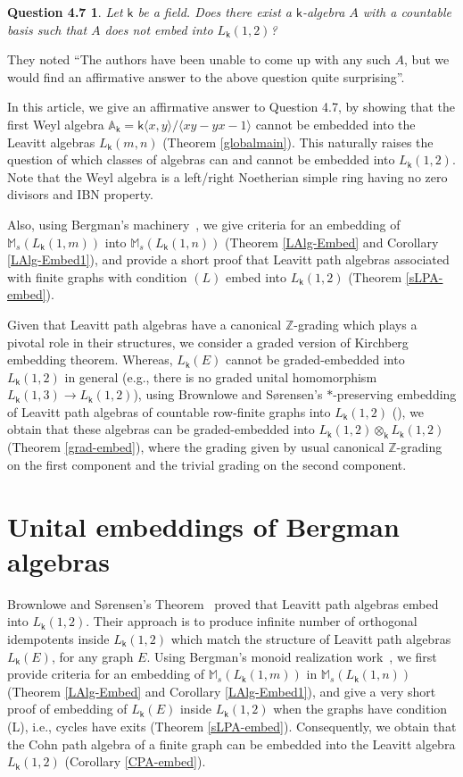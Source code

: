 \documentclass[a4paper, 11pt, reqno]{amsart}
\newtheorem*{ques}{Question 4.7}
\theoremstyle{definition}
\def\M{\mathbb{M}}
\newcommand{\K}{\mathsf{k}}
\begin{document}
\begin{ques}\label{sorensen}
Let $\K$ be a field. Does there exist a $\K$-algebra $A$ with a countable basis
such that $A$ does not embed into $L_\K(1,2)$?
\end{ques}

They noted ``The authors have been unable to come up with any such $A$, but we would find an
affirmative answer to the above question quite surprising''.

In this article,  we give an affirmative answer to Question 4.7, by showing that the first Weyl algebra  $\mathbb A_\K=\K\langle x, y\rangle/\langle xy-yx- 1\rangle$ cannot be embedded into the Leavitt algebras $L_\K(m,n)$ (Theorem \ref{globalmain}). This naturally raises the question of which classes of algebras can and cannot be embedded into $L_\K(1,2)$. Note that the Weyl algebra is a left/right Noetherian simple ring having no zero divisors and IBN property. 

Also, using Bergman's machinery~\cite{Berg74}, we give criteria for an embedding of $\M_s(L_{\K}(1, m))$ into $\M_s(L_{\K}(1, n))$ (Theorem \ref{LAlg-Embed} and Corollary \ref{LAlg-Embed1}), and provide a short proof that Leavitt path algebras associated with finite graphs with condition $(L)$  embed into $L_\K(1,2)$ (Theorem \ref{sLPA-embed}).

Given that Leavitt path algebras have a canonical $\mathbb Z$-grading which plays a pivotal role in their structures, we consider a graded version of Kirchberg embedding theorem. Whereas, $L_\K(E)$ cannot be graded-embedded into $L_\K(1,2)$ in general (e.g., there is no graded unital homomorphism $L_\K(1,3) \rightarrow L_\K(1,2)$), using Brownlowe and S\o rensen's $*$-preserving embedding of Leavitt path algebras of countable row-finite graphs into $L_\K(1, 2)$ (\cite[Theorem 4.1]{brownsor}), we obtain that these algebras can be graded-embedded into $L_\K(1,2)\otimes_\K L_\K(1,2)$ (Theorem \ref{grad-embed}), where 
the grading given by usual canonical $\mathbb Z$-grading on the first component and 
the trivial grading on the second component.  



\section{Unital embeddings of Bergman algebras}
 
Brownlowe and S\o rensen's Theorem~\cite{brownsor} proved that  Leavitt path algebras embed into $L_\K(1,2)$. Their approach is to produce infinite number of orthogonal idempotents inside $L_\K(1,2)$ which match the structure of Leavitt path algebras $L_\K(E)$, for any graph $E$. Using Bergman's monoid realization work~\cite{Berg74}, we first 
provide criteria for an embedding of $\M_s(L_{\K}(1, m))$ in $\M_s(L_{\K}(1, n))$ (Theorem \ref{LAlg-Embed} and Corollary \ref{LAlg-Embed1}), and give a very short proof of embedding of $L_\K(E)$ inside $L_\K(1,2)$ when the graphs have condition (L), i.e., cycles have exits (Theorem \ref{sLPA-embed}). Consequently, we obtain that the Cohn path algebra of a finite graph can be embedded into the Leavitt algebra $L_{\K}(1, 2)$ (Corollary \ref{CPA-embed}).
  
\end{document}
